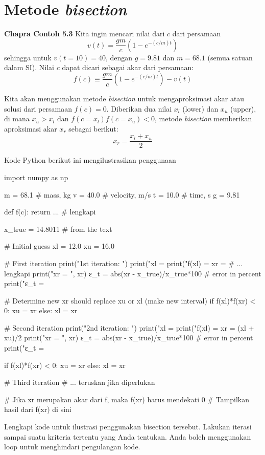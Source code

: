 \section{Metode \textit{bisection}}

\textbf{Chapra Contoh 5.3}
Kita ingin mencari nilai dari $c$ dari persamaan
\begin{equation*}
v(t) = \frac{gm}{c}(1 - e^{-(c/m)t})
\end{equation*}
sehingga untuk $v(t=10) = 40$, dengan $g=9.81$ dan $m=68.1$ (semua satuan dalam SI).
Nilai $c$ dapat dicari sebagai akar dari persamaan:
\begin{equation*}
f(c) \equiv \frac{gm}{c}(1 - e^{-(c/m)t}) - v(t)
\end{equation*}

Kita akan menggunakan metode \textit{bisection} untuk mengaproksimasi akar atau solusi dari
persamaan $f(c) = 0$. Diberikan dua nilai $x_{l}$ (lower) dan $x_{u}$ (upper), di mana
$x_{u} > x_{l}$ dan $f(c=x_{l})f(c=x_{u}) < 0$, metode \textit{bisection} memberikan
aproksimasi akar $x_{r}$ sebagai berikut:
\begin{equation}
x_{r} = \frac{x_{l} + x_{u}}{2}
\end{equation}

Kode Python berikut ini mengilustrasikan penggunaan 
\begin{pythoncode}
import numpy as np

m = 68.1 # mass, kg
v = 40.0 # velocity, m/s
t = 10.0 # time, s
g = 9.81
    
def f(c):
    return ... # lengkapi
    
x_true = 14.8011 # from the text
    
# Initial guess
xl = 12.0
xu = 16.0
    
# First iteration
print("\n1st iteration: ")
print("xl = %
print("f(xl) = %
xr = # ... lengkapi
print("xr = ", xr)
ε_t = abs(xr - x_true)/x_true*100 # error in percent
print("ε_t = %

# Determine new xr should replace xu or xl (make new interval)
if f(xl)*f(xr) < 0:
    xu = xr
else:
    xl = xr
    
# Second iteration
print("\n2nd iteration: ")
print("xl = %
print("f(xl) = %
xr = (xl + xu)/2
print("xr = ", xr)
ε_t = abs(xr - x_true)/x_true*100 # error in percent
print("ε_t = %

if f(xl)*f(xr) < 0:
    xu = xr
else:
    xl = xr
    
# Third iteration
# ... teruskan jika diperlukan

# Jika xr merupakan akar dari f, maka f(xr) harus mendekati 0
# Tampilkan hasil dari f(xr) di sini
\end{pythoncode}

\begin{soal}
Lengkapi kode untuk ilustrasi penggunakan bisection tersebut. Lakukan iterasi sampai
suatu kriteria tertentu yang Anda tentukan. Anda boleh menggunakan loop
untuk menghindari pengulangan kode.
\end{soal}

